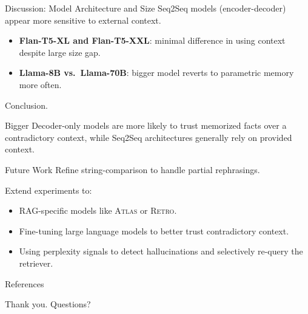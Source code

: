 \documentclass[10pt]{beamer}
\begin{document}
\begin{frame}{Discussion: Model Architecture and Size}
Seq2Seq models (encoder-decoder) appear more sensitive to external context.

\begin{itemize}
  \item \textbf{Flan-T5-XL and Flan-T5-XXL}: minimal difference in using context despite large size gap.
  \item \textbf{Llama-8B vs.\ Llama-70B}: bigger model reverts to parametric memory more often.
\end{itemize}

Conclusion.

Bigger Decoder-only models are more likely to trust memorized facts over a contradictory context, while Seq2Seq architectures generally rely on provided context.

\end{frame}

\begin{frame}{Future Work}
Refine string-comparison to handle partial rephrasings.

Extend experiments to:
\begin{itemize}
  \item RAG-specific models like \textsc{Atlas} or \textsc{Retro}.
  \item Fine-tuning large language models to better trust contradictory context.
  \item Using perplexity signals to detect hallucinations and selectively re-query the retriever.
\end{itemize}

\end{frame}

\begin{frame}{References}
\small



\end{frame}

\begin{frame}
\centering
\Large
Thank you. Questions?
\end{frame}
\end{document}

